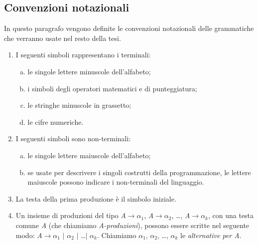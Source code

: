 \subsection{Convenzioni notazionali}
In questo paragrafo vengono definite le convenzioni notazionali delle grammatiche che verranno usate nel resto della tesi.
\begin{enumerate}
	\item I seguenti simboli rappresentano i terminali:
	\begin{enumerate}[(a)]
		\item le singole lettere minuscole dell'alfabeto;
		\item i simboli degli operatori matematici e di punteggiatura;
		\item le stringhe minuscole in grassetto;
		\item le cifre numeriche.
	\end{enumerate}
	\item I seguenti simboli sono non-terminali:
	\begin{enumerate}[(a)]
		\item le singole lettere maiuscole dell'alfabeto;  
		\item se usate per descrivere i singoli costrutti della programmazione, le lettere maiuscole possono indicare i non-terminali del linguaggio.
	\end{enumerate}
	\item La testa della prima produzione è il simbolo iniziale.
	\item Un insieme di produzioni del tipo \textit{A$\to$$\alpha_{1}$}, \textit{A$\to$$\alpha_{2}$}, \dots, \textit{A$\to$$\alpha_{k}$}, con una testa comune \textit{A} (che chiamiamo \textit{A-produzioni}), 
	possono essere scritte nel seguente modo: \textit{A}$\to$$\alpha_{1}$ $\mid$ $\alpha_{2}$ $\mid$ \dots $\mid$ $\alpha_{k}$. Chiamiamo $\alpha_{1}$, $\alpha_{2}$, \dots , $\alpha_{k}$ le \textit{alternative per A}.
\end{enumerate} 
